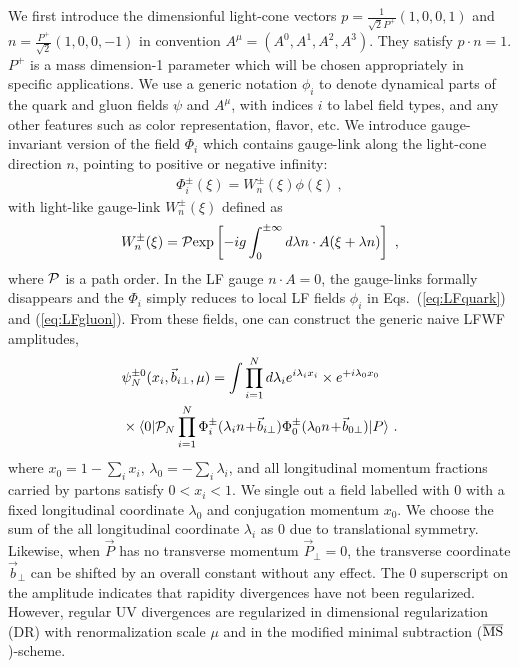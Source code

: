 \documentclass[twocolumn,superscriptaddress,longbibliography,10pt]{revtex4-1}
\begin{document}
We first introduce the dimensionful light-cone vectors $p=\frac{1}{\sqrt{2}P^+}(1,0,0,1)$ and $n=\frac{P^+}{\sqrt{2}}(1,0,0,-1)$ in convention $A^\mu=(A^0,A^1,A^2,A^3)$.
They satisfy $p\cdot n=1$. $P^+$ is a mass dimension-1 parameter which will be chosen appropriately in specific applications. We use a generic notation $\phi_i$ to denote dynamical parts of the quark and gluon fields $\psi$ and $A^\mu$, with indices $i$
to label field types, and any other features such as color representation, flavor, etc.
We introduce gauge-invariant version of the field $\Phi_i$ which contains gauge-link along the light-cone direction $n$, pointing to positive or negative infinity:
\begin{align}
\Phi^{\pm}_{i}(\xi)=W_{n}^{\pm}(\xi)\phi(\xi) \ ,
\end{align}
with light-like gauge-link $W_{n}^{\pm}(\xi)$ defined as
\begin{align}
   W_{n}^{\pm}(\xi)= {\cal P}{\rm exp}\left[-ig\int_{0}^{\pm \infty} d\lambda n\cdot A(\xi+\lambda n)\right] \ ,
\end{align}
where ${\cal P}$ is a path order.
In the LF gauge $n\cdot A=0$, the gauge-links formally disappears and the $\Phi_i$ simply reduces to local LF fields $\phi_i$ in Eqs.~(\ref{eq:LFquark}) and (\ref{eq:LFgluon}). From these fields, one can construct the generic naive LFWF amplitudes,
\begin{align}\label{eq:naiveLFa}
&\psi^{\pm0}_{N}(x_i,\vec{b}_{i\perp},\mu)=\int \prod^N_{i=1} d\lambda_i e^{i\lambda_i x_{i}}\times e^{+i\lambda_0x_0} \\ &\times\langle 0 | {\cal P}_N\prod^N_{i=1}\Phi^{\pm}_{i}(\lambda_{i}n\!+\!\vec{b}_{i\perp})\Phi^{\pm}_0(\lambda_0n\!+\!{\vec b}_{0\perp}) |P\rangle \ . \nonumber
\end{align}
where $x_0=1 - \sum_i x_i$, $\lambda_0=-\sum_i\lambda_i$, and all longitudinal momentum fractions carried by partons satisfy $0<x_i<1$. We single out a field labelled with 0 with a fixed longitudinal coordinate $\lambda_0$ and conjugation momentum $x_0$. We choose
the sum of the all longitudinal coordinate $\lambda_i$ as $0$ due to translational symmetry. Likewise, when $\vec{P}$ has no
transverse momentum $\vec{P}_\perp =0$, the transverse coordinate $\vec{b}_\perp$
can be shifted by an overall constant without any effect.
The 0 superscript on the amplitude indicates that rapidity divergences have not been regularized. However, regular UV divergences
are regularized in dimensional regularization (DR) with renormalization scale $\mu$ and in the modified minimal subtraction ($\overline {\rm MS}$)-scheme.
\end{document}
